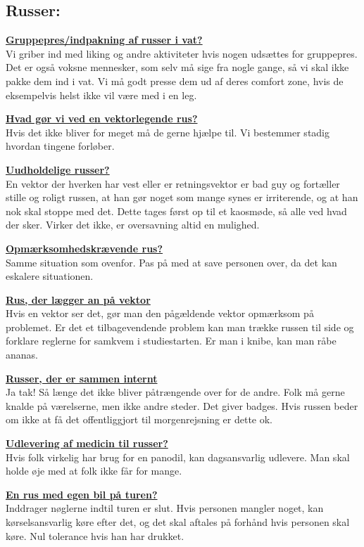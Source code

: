 \subsection*{Russer:}
\underline{\textbf{Gruppepres/indpakning af russer i vat?}}\\
Vi griber ind med liking og andre aktiviteter hvis nogen udsættes for gruppepres. Det er også voksne mennesker, som selv må sige fra nogle gange, så vi skal ikke pakke dem ind i vat. Vi må godt presse dem ud af deres comfort zone, hvis de eksempelvis helst ikke vil være med i en leg. 

\underline{\textbf{Hvad gør vi ved en vektorlegende rus?}}\\
Hvis det ikke bliver for meget må de gerne hjælpe til. Vi bestemmer stadig hvordan tingene forløber. 

\underline{\textbf{Uudholdelige russer?}}\\
En vektor der hverken har vest eller er retningsvektor er bad guy og fortæller stille og roligt russen, at han gør noget som mange synes er irriterende, og at han nok skal stoppe med det. Dette tages først op til et kaosmøde, så alle ved hvad der sker. Virker det ikke, er oversavning altid en mulighed. 

\underline{\textbf{Opmærksomhedskrævende rus?}}\\
Samme situation som ovenfor. Pas på med at save personen over, da det kan eskalere situationen.

\underline{\textbf{Rus, der lægger an på vektor}}\\
Hvis en vektor ser det, gør man den pågældende vektor opmærksom på problemet. Er det et tilbagevendende problem kan man trække russen til side og forklare reglerne for samkvem i studiestarten. Er man i knibe, kan man råbe ananas. 

\underline{\textbf{Russer, der er sammen internt}}\\
Ja tak! Så længe det ikke bliver påtrængende over for de andre. Folk må gerne knalde på værelserne, men ikke andre steder. Det giver badges. Hvis russen beder om ikke at få det offentliggjort til morgenrejsning er dette ok. 

\underline{\textbf{Udlevering af medicin til russer?}}\\
Hvis folk virkelig har brug for en panodil, kan dagsansvarlig udlevere. Man skal holde øje med at folk ikke får for mange. 

\underline{\textbf{En rus med egen bil på turen?}}\\
Inddrager nøglerne indtil turen er slut. Hvis personen mangler noget, kan kørselsansvarlig køre efter det, og det skal aftales på forhånd hvis personen skal køre. Nul tolerance hvis han har drukket. 

